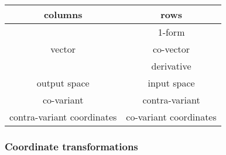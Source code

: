 \begin{center}
  \begin{tabular}{||c||c||}
\hline
\hline
columns & rows \\
\hline
\multirow{3}{*}{vector} & 1-form  \\
& co-vector \\
& derivative \\
\hline
output space & input space \\
\hline
co-variant & contra-variant \\
\hline
contra-variant coordinates & co-variant coordinates \\
\hline
\hline
\end{tabular}
\end{center}


\subsubsection{Coordinate transformations}\label{coordinate}

